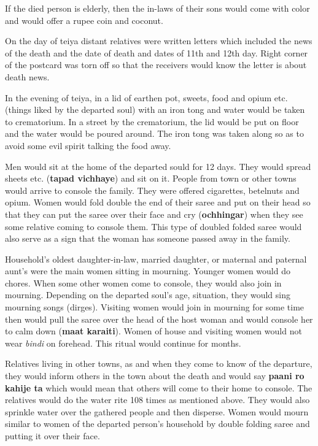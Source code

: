 If the died person is elderly, then the in-laws of their sons would come with
color and would offer a rupee coin and coconut.

On the day of teiya distant relatives were written letters which included the
news of the death and the date of death and dates of 11th and 12th day. Right
corner of the postcard was torn off so that the receivers would know the letter
is about death news.

In the evening of teiya, in a lid of earthen pot, sweets, food and opium etc.
(things liked by the departed soul) with an iron tong and water would be taken
to crematorium. In a street by the crematorium, the lid would be put on floor
and the water would be poured around. The iron tong was taken along so as to
avoid some evil spirit talking the food away.

Men would sit at the home of the departed sould for 12 days. They would spread
sheets etc. (\textbf{tapad vichhaye}) and sit on it. People from town or other
towns would arrive to console the family. They were offered cigarettes,
betelnuts and opium. Women would fold double the end of their saree and put on
their head so that they can put the saree over their face and cry
(\textbf{ochhingar}) when they see some relative coming to console them. This
type of doubled folded saree would also serve as a sign that the woman has
someone passed away in the family.

Household's oldest daughter-in-law, married daughter, or maternal and paternal
aunt's were the main women sitting in mourning. Younger women would do chores.
When some other women come to console, they would also join in mourning.
Depending on the departed soul's age, situation, they would sing mourning songs
(dirges). Visiting women would join in mourning for some time then would pull
the saree over the head of the host woman and would console her to calm down
(\textbf{maat karaiti}). Women of house and visiting women would not wear
\textit{bindi} on forehead. This ritual would continue for months.

Relatives living in other towns, as and when they come to know of the
departure, they would inform others in the town about the death and would say
\textbf{paani ro kahije ta} which would mean that others will come to their
home to console. The relatives would do the water rite 108 times as mentioned
above. They would also sprinkle water over the gathered people and then
disperse. Women would mourn similar to women of the departed person's household
by double folding saree and putting it over their face.

